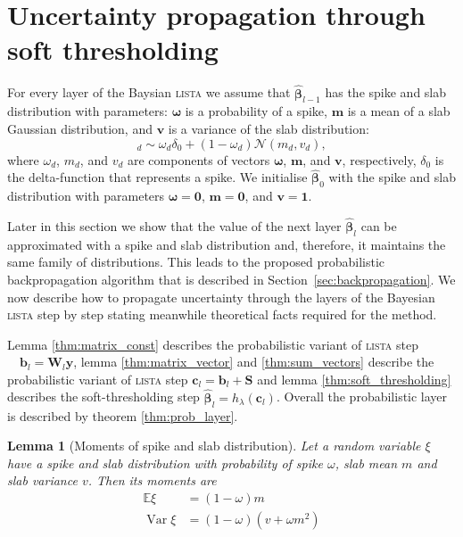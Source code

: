 \documentclass[letterpaper]{article}
\newtheorem{lemma}{Lemma}
\begin{document}
\section{Uncertainty propagation through soft thresholding}
\label{sec:fprop}
For every layer of the Baysian \textsc{lista} we assume that $\widehat{\boldsymbol\beta}_{l-1}$ has the spike and slab distribution with parameters: $\boldsymbol\omega$ is a probability of a spike, $\mathbf{m}$ is a mean of a slab Gaussian distribution, and $\mathbf{v}$ is a variance of the slab distribution:
\begin{equation}
[\boldsymbol\beta_{l-1}]_d \sim \omega_d \delta_0 + (1 - \omega_d)\mathcal{N}(m_d, v_d),
\end{equation}
where $\omega_d$, $m_d$, and $v_d$ are components of vectors $\boldsymbol\omega$, $\mathbf{m}$, and $\mathbf{v}$, respectively, $\delta_0$ is the delta-function that represents a spike. 
We initialise $\widehat{\boldsymbol\beta}_{0}$ with the spike and slab distribution with parameters $\boldsymbol\omega = \mathbf{0}$, $\mathbf{m} = \mathbf{0}$, and $\mathbf{v} = \mathbf{1}$. 

Later in this section we show that the value of the next layer $\widehat{\boldsymbol\beta}_l$ can be approximated with a spike and slab distribution and, therefore, it maintains the same family of distributions. This leads to the proposed probabilistic backpropagation algorithm that is described in Section~\ref{sec:backpropagation}. We now describe how to propagate uncertainty through the layers of the Bayesian \textsc{lista} step by step stating meanwhile theoretical facts required for the method.

Lemma \ref{thm:matrix_const} describes the probabilistic variant of \textsc{lista} step $\quad \mathbf{b}_l = \mathbf{W}_l \mathbf{y}$, lemma \ref{thm:matrix_vector} and \ref{thm:sum_vectors} describe the probabilistic variant of \textsc{lista} step $ \mathbf{c}_l = \mathbf{b}_l +\mathbf{S}$ and lemma \ref{thm:soft_thresholding} describes the soft-thresholding step $\widehat{\boldsymbol\beta}_{l} = h_\lambda(\mathbf{c}_l)$. Overall the probabilistic layer is described by theorem \ref{thm:prob_layer}.

\begin{lemma}[Moments of spike and slab distribution]
\label{thm:moments_spsl}
Let a random variable $\xi$ have a spike and slab distribution with probability of spike $\omega$, slab mean $m$ and slab variance $v$. Then its moments are
\begin{subequations}
\begin{align}
\mathbb{E}\xi &= (1-\omega)m \\
\operatorname{Var}\xi & = (1-\omega)(v + \omega m^2)
\end{align}
\end{subequations}
\end{lemma}
\end{document}
